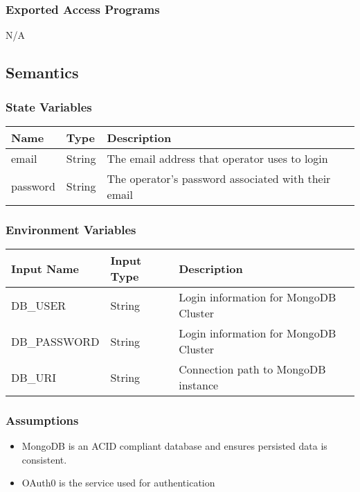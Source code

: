 \documentclass[12pt, titlepage]{article}
\begin{document}
\subsubsection{Exported Access Programs}

N/A

\subsection{Semantics}



\subsubsection{State Variables}
\begin{center}
\begin{tabular}{p{4cm} p{4cm} p{4cm}}
\hline
\textbf{Name} & \textbf{Type} & \textbf{Description} \\
\hline
email& String & The email address that operator uses to login\\
\hline
password& String & The operator’s password associated with their email\\
\end{tabular}
\end{center}


\subsubsection{Environment Variables}
\begin{center}
\begin{tabular}{p{4cm} p{4cm} p{4cm}}
\hline
\textbf{Input Name} & \textbf{Input Type} & \textbf{Description} \\
\hline
DB\_USER & String & Login information for MongoDB Cluster \\
\hline
DB\_PASSWORD & String & Login information for MongoDB Cluster \\
\hline
DB\_URI & String & Connection path to MongoDB instance \\
\hline
\end{tabular}
\end{center}


\subsubsection{Assumptions}


\begin{itemize}
    \item MongoDB is an ACID compliant database and ensures persisted data is consistent.
    \item OAuth0 is the service used for authentication
\end{itemize}
 
\end{document}
